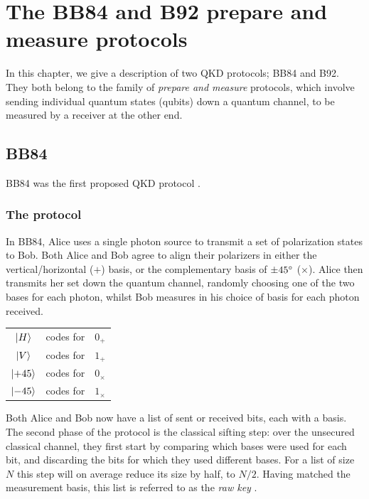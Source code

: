 \documentclass[paper=a4, fontsize=11pt]{scrartcl} %
\numberwithin{equation}{section} %
\numberwithin{figure}{section} %
\numberwithin{table}{section} %
\begin{document}
\clearpage
\section{The BB84 and B92 prepare and measure protocols}

In this chapter, we give a description of two QKD protocols; BB84 and B92.
They both belong to the family of \textit{prepare and measure} protocols, which
involve sending individual quantum states (qubits) down a quantum channel,
to be measured by a receiver at the other end.

\subsection{BB84}

BB84 was the first proposed QKD protocol \citep{BB84, historyBrassard}.

\subsubsection*{The protocol}
In BB84, Alice uses a single photon source to transmit a set of polarization states to Bob.
Both Alice and Bob agree to align
their polarizers in either the vertical/horizontal ($+$) basis, or the
complementary basis of $\pm 45 \degree$  ($\times$). Alice then transmits her set
down the quantum channel, randomly choosing one of the two bases for each
photon, whilst Bob measures in his choice of basis for each photon received.

\begin{center}
\begin{tabular}{c c c}
	$\ket{H}$  & codes for & $0_+$ \\
	$\ket{V}$  & codes for & $1_+$ \\
	$\ket{+45}$  & codes for & $0_\times$ \\
	$\ket{-45}$  & codes for & $1_\times$ \\
\end{tabular}
\end{center}

Both Alice and Bob now have a list of sent or received bits, each with a basis. The second
phase of the protocol is the classical sifting step: over the unsecured classical channel, they
first start by comparing which bases were used for each bit, and discarding the bits for which
they used different bases. For a list of size $N$ this step will on average reduce its size by half,
to $N/2$. Having matched the measurement basis, this list is referred to as the \textit{raw key} \citep{gisin2002}.
\end{document}
